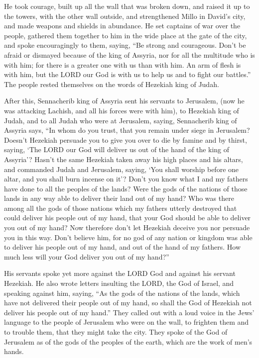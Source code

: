 \myverse{}He took courage, built up all the wall that was broken down, and
raised it up to the towers, with the other wall outside, and strengthened Millo in David’s city, and made
weapons and shields in abundance.
\myverse{}He set captains of war over the people, gathered them together to him in the
wide place at the gate of the city, and spoke encouragingly to them, saying,
\myverse{}“Be strong and courageous. Don’t be afraid or dismayed because of the king
of Assyria, nor for all the multitude who is with him; for there is a greater one with us than with him.
\myverse{}An arm of flesh is with him, but the LORD our God is with us to help us and
to fight our battles.” The people rested themselves on the words of Hezekiah king of Judah.

\myverse{}After this, Sennacherib king of Assyria sent his servants to Jerusalem,
(now he was attacking Lachish, and all his forces were with him), to Hezekiah king of Judah, and to all
Judah who were at Jerusalem, saying,
\myverse{}Sennacherib king of Assyria says, “In whom do you trust, that you remain
under siege in Jerusalem?
\myverse{}Doesn’t Hezekiah persuade you to give you over to die by famine and by thirst,
saying, ‘The LORD our God will deliver us out of the hand of the king of Assyria’?
\myverse{}Hasn’t the same Hezekiah taken away his high places and his altars, and commanded
Judah and Jerusalem, saying, ‘You shall worship before one altar, and you shall burn incense on it’?
\myverse{}Don’t you know what I and my fathers have done to all the peoples of the
lands? Were the gods of the nations of those lands in any way able to deliver their land out of my hand?
\myverse{}Who was there among all the gods of those nations which my fathers utterly
destroyed that could deliver his people out of my hand, that your God should be able to deliver you out
of my hand?
\myverse{}Now therefore don’t let Hezekiah deceive you nor persuade you in this way.
Don’t believe him, for no god of any nation or kingdom was able to deliver his people out of my hand,
and out of the hand of my fathers. How much less will your God deliver you out of my hand?”

\myverse{}His servants spoke yet more against the LORD God and against
his servant Hezekiah.
\myverse{}He also wrote letters insulting the LORD, the God of Israel, and speaking
against him, saying, “As the gods of the nations of the lands, which have not delivered their people out
of my hand, so shall the God of Hezekiah not deliver his people out of my hand.”
\myverse{}They called out with a loud voice in the Jews’ language to the people of
Jerusalem who were on the wall, to frighten them and to trouble them, that they might take the city.
\myverse{}They spoke of the God of Jerusalem as of the gods of the peoples of the earth,
which are the work of men’s hands.

